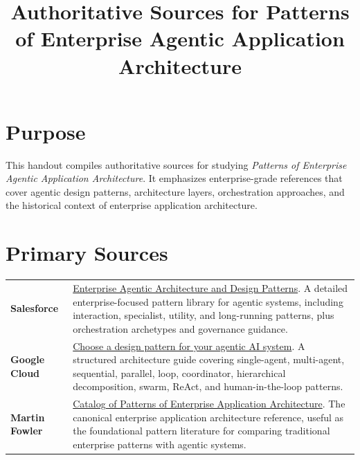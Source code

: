 \documentclass[11pt]{article}
\title{Authoritative Sources for Patterns of Enterprise Agentic Application Architecture}
\author{}
\date{}
\begin{document}
\maketitle

\section{Purpose}
This handout compiles authoritative sources for studying \textit{Patterns of Enterprise Agentic Application Architecture}. It emphasizes enterprise-grade references that cover agentic design patterns, architecture layers, orchestration approaches, and the historical context of enterprise application architecture.

\section{Primary Sources}

\begin{tabularx}{\textwidth}{>{\bfseries}p{}X}
Salesforce & \href{https://architect.salesforce.com/docs/architect/fundamentals/guide/enterprise-agentic-architecture.html}{Enterprise Agentic Architecture and Design Patterns}. A detailed enterprise-focused pattern library for agentic systems, including interaction, specialist, utility, and long-running patterns, plus orchestration archetypes and governance guidance. \\
Google Cloud & \href{https://docs.cloud.google.com/architecture/choose-design-pattern-agentic-ai-system}{Choose a design pattern for your agentic AI system}. A structured architecture guide covering single-agent, multi-agent, sequential, parallel, loop, coordinator, hierarchical decomposition, swarm, ReAct, and human-in-the-loop patterns. \\
Martin Fowler & \href{https://martinfowler.com/eaaCatalog/}{Catalog of Patterns of Enterprise Application Architecture}. The canonical enterprise application architecture reference, useful as the foundational pattern literature for comparing traditional enterprise patterns with agentic systems. \\
\end{tabularx}
\end{document}
